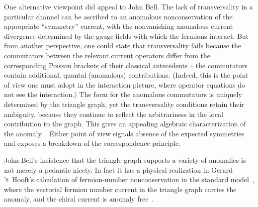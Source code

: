 \documentclass[a4paper,12pt,twoside]{article}
\begin{document}
One alternative viewpoint did appeal to John Bell. The lack of transversality in a
particular channel can be ascribed to an anomalous nonconservation of
the appropriate ``symmetry'' current, with the nonvanishing anomalous current
divergence determined by the gauge fields with which the fermions interact. But
from another perspective, one could state that  transversality fails because the
commutators between the relevant current operators differ from the corresponding
Poisson brackets of their classical antecedents --  the commutators contain additional,
quantal (anomalous) contributions. (Indeed, this is the point of view one must adopt
in the interaction picture, where operator equations do not see the interaction.) The
form for the anomalous commutators is uniquely determined by the triangle graph,
yet the transversality conditions retain their ambiguity, because they continue to
reflect the arbitrariness in the local contribution to the graph. This gives an appealing
algebraic characterization of the anomaly~\cite{ref4}. Either point of view signals
absence of the expected symmetries and exposes a breakdown of the
correspondence principle.

John Bell's insistence that the triangle graph supports a variety of anomalies is not
merely a pedantic nicety. In fact it has a physical realization in Gerard 't~Hooft's
calculation of fermion-number nonconservation in the standard model~\cite{ref5},
where the vectorial fermion number current in the triangle graph carries the
anomaly, and the chiral current is anomaly free~\cite{ref6}. 
\vspace*{-\bigskipamount}
\end{document}
